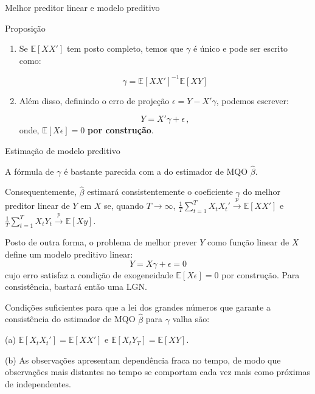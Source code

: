 \documentclass[11pt]{beamer}
\newenvironment{halfwideitemize}{\itemize\addtolength{\itemsep}{0.5em}}{\enditemize}
\begin{document}
	\begin{frame}{Melhor preditor linear e modelo preditivo}
			\begin{block}{Proposição}
			\begin{enumerate}
				\item 		Se $\mathbb{E}[XX']$ tem posto completo, temos que $\gamma$ é único e pode ser escrito como:
				
				$$\gamma = \mathbb{E}[XX']^{-1}\mathbb{E}[XY]$$
				
				\item Além disso, definindo o erro de projeção $\epsilon = Y- X'\gamma$, podemos escrever:
				
				$$Y = X'\gamma + \epsilon \, ,$$
				onde, $\mathbb{E}[X \epsilon] = 0$ \textbf{por construção}.
				
			\end{enumerate}
			
		\end{block}
	\end{frame}
	\begin{frame}{Estimação de modelo preditivo}
		\begin{halfwideitemize}
			\item A fórmula de $\gamma$ é bastante parecida com a do estimador de MQO $\hat{\beta}$.
			\begin{halfwideitemize}
				\item Consequentemente, $\hat{\beta}$ estimará consistentemente o coeficiente $\gamma$ do melhor preditor linear de $Y$ em $X$ se, quando $T \to \infty$, $\frac{1}{T}\sum_{t=1}^T X_t X_t' \overset{p}{\to} \mathbb{E}[XX']$ e $\frac{1}{T}\sum_{t=1}^T X_t Y_t \overset{p}{\to} \mathbb{E}[X y]$.
			\end{halfwideitemize}
			\item Posto de outra forma, o problema de melhor prever $Y$ como função linear de $X$ define um {\color{blue}modelo preditivo linear}:
			$$Y = X\gamma + \epsilon = 0$$
			cujo erro satisfaz a condição de exogeneidade $\mathbb{E}[X\epsilon] = 0$ {\color{red}por construção}. Para consistência, bastará então uma LGN.
		\end{halfwideitemize}
			\begin{halfwideitemize}
			\item Condições suficientes para que a lei dos grandes números que garante a consistência do estimador de MQO $\hat{\beta}$ para $\gamma$ valha são:
			\begin{halfwideitemize}
				\item[(a)] $\mathbb{E}[X_t X_t'] = \mathbb{E}[XX']$ e $\mathbb{E}[X_t Y_T]=\mathbb{E}[X Y]$.
				\item[(b)] {\color{blue}As observações apresentam dependência fraca no tempo}, de modo que observações mais distantes no tempo se comportam cada vez mais como próximas de independentes.
			\end{halfwideitemize}
		\end{halfwideitemize}
	\end{frame}
\end{document}
